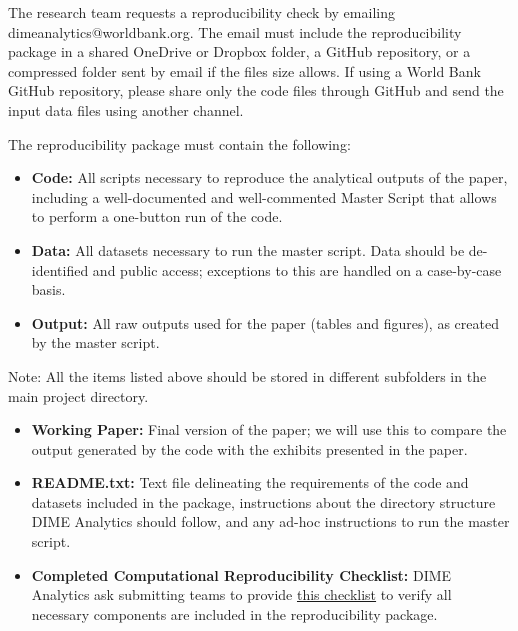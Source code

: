 \begin{fullwidth}
	The research team requests a reproducibility check by emailing dimeanalytics@worldbank.org. The email must include the reproducibility package in a shared OneDrive or Dropbox folder, a GitHub repository, or a compressed folder sent by email if the files size allows. If using a World Bank GitHub repository, please share only the code files through GitHub and send the input data files using another channel. 
	
	The reproducibility package must contain the following:

	\bigskip

	\begin{itemize}
		\setlength\itemsep{-0.1em}
		\item \textbf{Code:} All scripts necessary to reproduce the analytical outputs of the paper, including a well-documented and well-commented Master Script that allows to perform a one-button run of the code.
		\item \textbf{Data:} All datasets necessary to run the master script. Data should be de-identified and public access; exceptions to this are handled on a case-by-case basis.
		\item \textbf{Output:} All raw outputs used for the paper (tables and figures), as created by the master script.
	\end{itemize}

	\bigskip

	Note: All the items listed above should be stored in different subfolders in the main project directory.

	\bigskip

	\begin{itemize}
		\setlength\itemsep{-0.1em}
		\item \textbf{Working Paper:} Final version of the paper; we will use this to compare the output generated by the code with the exhibits presented in the paper.
		\item \textbf{README.txt:} Text file delineating the requirements of the code and datasets included in the package, instructions about the directory structure DIME Analytics should follow, and any ad-hoc instructions to run the master script.
		\item \textbf{Completed Computational Reproducibility Checklist:} DIME Analytics ask submitting teams to provide \href{https://raw.githubusercontent.com/worldbank/dime-standards/master/dime-research-standards/pillar-3-research-reproducibility/checklists/Reproducibility%20package%20submission%20checklist.pdf}{this checklist} to verify all necessary components are included in the reproducibility package.
	\end{itemize}


\end{fullwidth}
